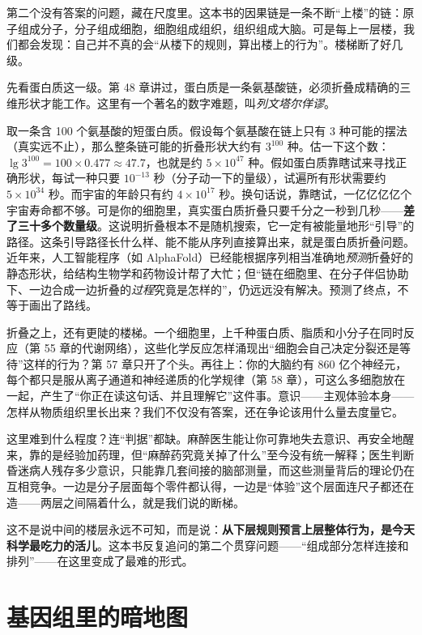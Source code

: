 第二个没有答案的问题，藏在尺度里。这本书的因果链是一条不断“上楼”的链：原子组成分子，分子组成细胞，细胞组成组织，组织组成大脑。可是每上一层楼，我们都会发现：自己并不真的会“从楼下的规则，算出楼上的行为”。楼梯断了好几级。

先看蛋白质这一级。第 48 章讲过，蛋白质是一条氨基酸链，必须折叠成精确的三维形状才能工作。这里有一个著名的数字难题，叫\emph{列文塔尔佯谬}。

\begin{qiaoliang}
取一条含 100 个氨基酸的短蛋白质。假设每个氨基酸在链上只有 3 种可能的摆法（真实远不止），那么整条链可能的折叠形状大约有 $3^{100}$ 种。估一下这个数：$\lg 3^{100} = 100 \times 0.477 \approx 47.7$，也就是约 $5\times 10^{47}$ 种。假如蛋白质靠瞎试来寻找正确形状，每试一种只要 $10^{-13}$ 秒（分子动一下的量级），试遍所有形状需要约 $5\times 10^{34}$ 秒。而宇宙的年龄只有约 $4\times 10^{17}$ 秒。换句话说，靠瞎试，一亿亿亿亿个宇宙寿命都不够。可是你的细胞里，真实蛋白质折叠只要千分之一秒到几秒——\textbf{差了三十多个数量级}。这说明折叠根本不是随机搜索，它一定有被能量地形“引导”的路径。这条引导路径长什么样、能不能从序列直接算出来，就是蛋白质折叠问题。近年来，人工智能程序（如 AlphaFold）已经能根据序列相当准确地\emph{预测}折叠好的静态形状，给结构生物学和药物设计帮了大忙；但“链在细胞里、在分子伴侣协助下、一边合成一边折叠的\emph{过程}究竟是怎样的”，仍远远没有解决。预测了终点，不等于画出了路线。
\end{qiaoliang}

折叠之上，还有更陡的楼梯。一个细胞里，上千种蛋白质、脂质和小分子在同时反应（第 55 章的代谢网络），这些化学反应怎样涌现出“细胞会自己决定分裂还是等待”这样的行为？第 57 章只开了个头。再往上：你的大脑约有 860 亿个神经元，每个都只是服从离子通道和神经递质的化学规律（第 58 章），可这么多细胞放在一起，产生了“你正在读这句话、并且理解它”这件事。意识——主观体验本身——怎样从物质组织里长出来？我们不仅没有答案，还在争论该用什么量去度量它。

这里难到什么程度？连“判据”都缺。麻醉医生能让你可靠地失去意识、再安全地醒来，靠的是经验加药理，但“麻醉药究竟关掉了什么”至今没有统一解释；医生判断昏迷病人残存多少意识，只能靠几套间接的脑部测量，而这些测量背后的理论仍在互相竞争。一边是分子层面每个零件都认得，一边是“体验”这个层面连尺子都还在造——两层之间隔着什么，就是我们说的断梯。

这不是说中间的楼层永远不可知，而是说：\textbf{从下层规则预言上层整体行为，是今天科学最吃力的活儿}。这本书反复追问的第二个贯穿问题——“组成部分怎样连接和排列”——在这里变成了最难的形式。

\section{基因组里的暗地图}


